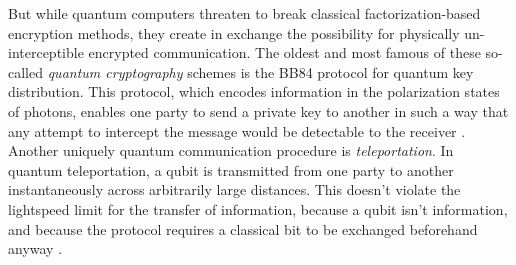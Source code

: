 \documentclass[12pt]{puthesis}
\newcommand{\notetoself}[1]{\textcolor{red}{#1}}
\begin{document}
But while quantum computers threaten to break classical factorization-based encryption methods, they create in exchange the possibility for physically un-interceptible encrypted communication. The oldest and most famous of these so-called \emph{quantum cryptography} schemes is the BB84 protocol for quantum key distribution. This protocol, which encodes information in the polarization states of photons, enables one party to send a private key to another in such a way that any attempt to intercept the message would be detectable to the receiver \cite{Bennett2014,Shor2000}. Another uniquely quantum communication procedure is \emph{teleportation}. In quantum teleportation, a qubit is transmitted from one party to another instantaneously across arbitrarily large distances. This doesn't violate the lightspeed limit for the transfer of information, because a qubit isn't information, and because the protocol requires a classical bit to be exchanged beforehand anyway \cite{Bennett1993}. 

\end{document}
